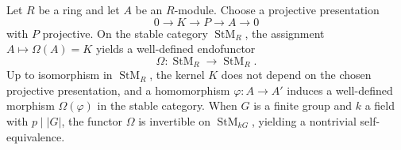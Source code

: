 Let $R$ be a ring and let $A$ be an $R$-module. Choose a projective presentation
\[
0 \to K \to P \to A \to 0
\]
with $P$ projective. On the stable category $\operatorname{StM}_R$, the assignment $A \mapsto \Omega(A) = K$ yields a well-defined endofunctor
\[
\Omega : \operatorname{StM}_R \to \operatorname{StM}_R.
\]
Up to isomorphism in $\operatorname{StM}_R$, the kernel $K$ does not depend on the chosen projective presentation, and a homomorphism $\varphi : A \to A'$ induces a well-defined morphism $\Omega(\varphi)$ in the stable category. When $G$ is a finite group and $k$ a field with $p \mid |G|$, the functor $\Omega$ is invertible on $\operatorname{StM}_{kG}$, yielding a nontrivial self-equivalence.
